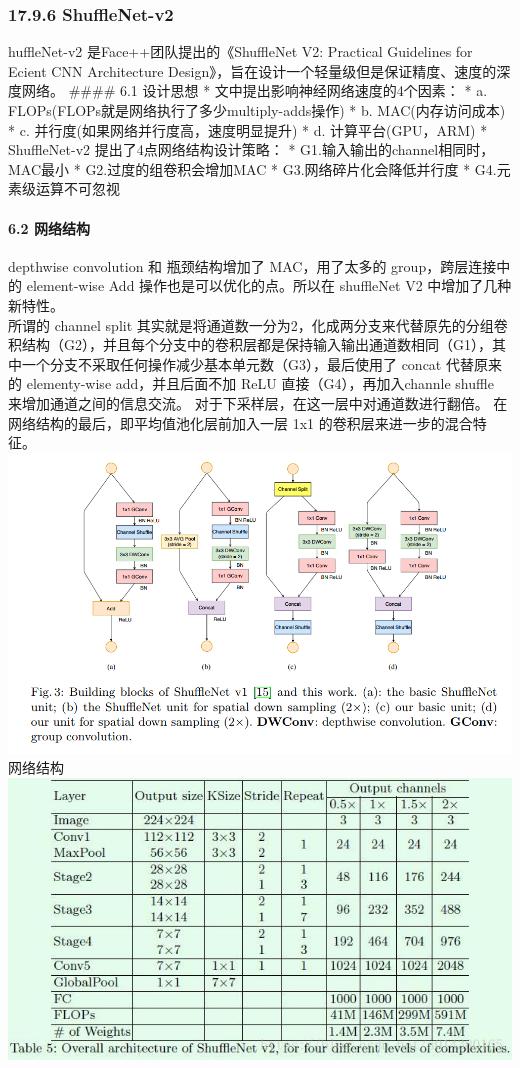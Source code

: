 \subsubsection{17.9.6 ShuffleNet-v2}\label{shufflenet-v2}

huffleNet-v2 是Face++团队提出的《ShuffleNet V2: Practical Guidelines for
Ecient CNN Architecture
Design》，旨在设计一个轻量级但是保证精度、速度的深度网络。 \#\#\#\# 6.1
设计思想 * 文中提出影响神经网络速度的4个因素： * a.
FLOPs(FLOPs就是网络执行了多少multiply-adds操作) * b. MAC(内存访问成本) *
c. 并行度(如果网络并行度高，速度明显提升) * d. 计算平台(GPU，ARM) *
ShuffleNet-v2 提出了4点网络结构设计策略： *
G1.输入输出的channel相同时，MAC最小 * G2.过度的组卷积会增加MAC *
G3.网络碎片化会降低并行度 * G4.元素级运算不可忽视

\paragraph{6.2 网络结构}\label{ux7f51ux7edcux7ed3ux6784}

depthwise convolution 和 瓶颈结构增加了 MAC，用了太多的
group，跨层连接中的 element-wise Add 操作也是可以优化的点。所以在
shuffleNet V2 中增加了几种新特性。\\
所谓的 channel split
其实就是将通道数一分为2，化成两分支来代替原先的分组卷积结构（G2），并且每个分支中的卷积层都是保持输入输出通道数相同（G1），其中一个分支不采取任何操作减少基本单元数（G3），最后使用了
concat 代替原来的 elementy-wise add，并且后面不加 ReLU
直接（G4），再加入channle shuffle 来增加通道之间的信息交流。
对于下采样层，在这一层中对通道数进行翻倍。
在网络结构的最后，即平均值池化层前加入一层 1x1
的卷积层来进一步的混合特征。 \includegraphics{./img/ch17/26.png}
网络结构\\
\includegraphics{./img/ch17/27.png}

